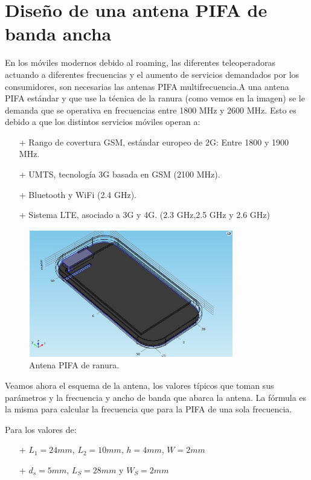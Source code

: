 \documentclass[a4paper,11pt,titlepage]{article}
\begin{document}
\section{Diseño de una antena PIFA de banda ancha}
En los móviles modernos debido al roaming, las diferentes teleoperadoras actuando a diferentes frecuencias y el aumento de servicios demandados por los consumidores, son necesarias las antenas PIFA multifrecuencia.A una antena PIFA estándar y que use la técnica de la ranura (como vemos en la imagen) se le demanda que se operativa en frecuencias entre 1800 MHz y 2600 MHz. Esto es debido a que los distintos servicios móviles operan a:\par
\begin{itemize}
\item[+] Rango de covertura GSM, estándar europeo de 2G: Entre 1800 y 1900 MHz.
\item[+] UMTS, tecnología 3G basada en GSM (2100 MHz).
\item[+] Bluetooth y WiFi (2.4 GHz).
\item[+] Sistema LTE, asociado a 3G y 4G. (2.3 GHz,2.5 GHz y 2.6 GHz)
\end{itemize}
\begin{figure}[H]
\centering
\includegraphics[width=0.8\textwidth]{pifamulti}
\caption{Antena PIFA de ranura.}
\end{figure}
Veamos ahora el esquema de la antena, los valores típicos que toman sus parámetros y la frecuencia y ancho de banda que abarca la antena. La fórmula es la misma para calcular la frecuencia que para la PIFA de una sola frecuencia. \par
Para los valores de:
\begin{itemize}
\item[+] $L_1=24mm$, $L_2=10mm$, $h=4mm$, $W=2mm$
\item[+] $d_s=5mm$, $L_S=28mm$ y $W_S=2mm$
\end{itemize}
\end{document}
